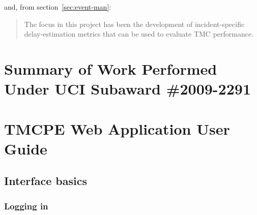 \documentclass[12pt]{report}
\newif\ifuserguide %
\begin{document}
and, from section~\ref{sec:event-man}:
\begin{quote}
  The focus in this project has been the development of incident-specific
  delay-estimation metrics that can be used to evaluate \ac{TMC} performance.
\end{quote}











\appendix


\chapter{Summary of Work Performed Under UCI Subaward \#2009-2291}
\label{chap:actlog-sub}

\clearpage



\clearpage


\ifuserguide%

\chapter{TMCPE Web Application User Guide}
\label{chap:user-guide}


\section{Interface basics}
\label{sec:ui-basics}

\subsection{Logging in}
\label{sec:ui-login}
\end{document}
